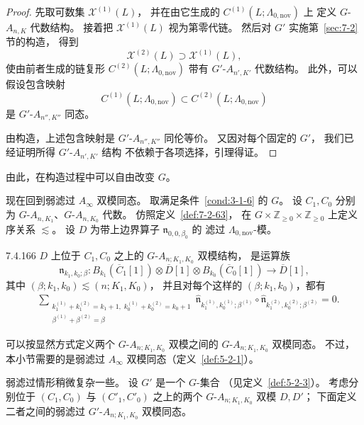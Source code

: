 \begin{proof}
先取可数集 $\mathcal X^{(1)}(L)$，
并在由它生成的
$C^{(1)}(L;\Lambda_{0,\mathrm{nov}})$ 上
定义 $G$-$A_{n,K}$ 代数结构。
接着把 $\mathcal X^{(1)}(L)$
视为第零代链。
然后对 $G'$ 实施第~\ref{sec:7-2} 节的构造，
得到
\[
\mathcal X^{(2)}(L)\supset\mathcal X^{(1)}(L),
\]
使由前者生成的链复形
$C^{(2)}(L;\Lambda_{0,\mathrm{nov}})$
带有 $G'$-$A_{n',K'}$ 代数结构。
此外，可以假设包含映射
\[
C^{(1)}(L;\Lambda_{0,\mathrm{nov}})
\subset
C^{(2)}(L;\Lambda_{0,\mathrm{nov}})
\]
是 $G'$-$A_{n'',K''}$ 同态。

由构造，上述包含映射是
$G'$-$A_{n'',K''}$ 同伦等价。
又因对每个固定的 $G'$，
我们已经证明所得 $G'$-$A_{n',K'}$ 结构
不依赖于各项选择，引理得证。
\end{proof}

由此，在构造过程中可以自由改变 $G$。

现在回到弱滤过 $A_\infty$ 双模同态。
取满足条件~\ref{cond:3-1-6} 的 $G$。
设 $C_1,C_0$ 分别为
$G$-$A_{n,K_1}$、$G$-$A_{n,K_0}$ 代数。
仿照定义~\ref{def:7-2-63}，
在
$G\times\mathbb Z_{\geq0}\times\mathbb Z_{\geq0}$
上定义序关系 $\lesssim$。
设 $D$ 为带上边界算子
$\mathfrak n_{0,0,\beta_0}$ 的
滤过 $\Lambda_{0,\mathrm{nov}}$-模。

\begin{definition}{7.4.166}\label{def:7-4-166}
$D$ 上位于 $C_1,C_0$ 之上的
$G$-$A_{n;K_1,K_0}$ 双模结构，
是运算族
\[
\mathfrak n_{k_1,k_0;\beta}\colon
B_{k_1}(\overline C_1[1])
\otimes\overline D[1]
\otimes B_{k_0}(\overline C_0[1])
\longrightarrow\overline D[1],
\]
其中 $(\beta;k_1,k_0)\lesssim(n;K_1,K_0)$，
并且对每个这样的 $(\beta;k_1,k_0)$，都有
\begin{equation}
\begin{aligned}
&\sum_{\substack{
k_1^{(1)}+k_1^{(2)}=k_1+1,\;
k_0^{(1)}+k_0^{(2)}=k_0+1\\
\beta^{(1)}+\beta^{(2)}=\beta}}
\widehat{\mathfrak n}_{
k_1^{(1)},k_0^{(1)};\beta^{(1)}}
\circ
\widehat{\mathfrak n}_{
k_1^{(2)},k_0^{(2)};\beta^{(2)}}
=0.
\end{aligned}
\tag{7.4.167}\label{eq:7-4-167}
\end{equation}
\end{definition}

可以按显然方式定义两个
$G$-$A_{n;K_1,K_0}$ 双模之间的
$G$-$A_{n;K_1,K_0}$ 双模同态。
不过，本小节需要的是弱滤过
$A_\infty$ 双模同态（定义~\ref{def:5-2-1}）。

弱滤过情形稍微复杂一些。
设 $G'$ 是一个 $G$-集合
（见定义~\ref{def:5-2-3}）。
考虑分别位于
$(C_1,C_0)$ 与 $(C'_1,C'_0)$ 之上的两个
$G$-$A_{n;K_1,K_0}$ 双模 $D,D'$；
下面定义二者之间的弱滤过
$G'$-$A_{n;K_1,K_0}$ 双模同态。

